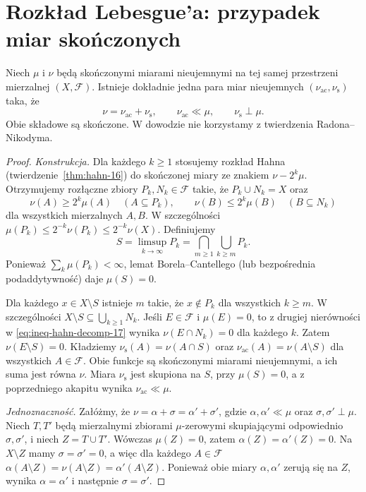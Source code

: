 \section{Rozkład Lebesgue'a: przypadek miar skończonych}
\begin{twierdzenie}
\label{thm:lebesgue-decomp-finite-17}
Niech $\mu$ i $\nu$ będą skończonymi miarami nieujemnymi
na tej samej przestrzeni mierzalnej $(X,\mathcal F)$.
Istnieje dokładnie jedna para miar nieujemnych
$(\nu_{\mathrm{ac}},\nu_{\mathrm{s}})$ taka, że
\begin{equation}\label{eq:decomp-finite-17}
\nu=\nu_{\mathrm{ac}}+\nu_{\mathrm{s}},\qquad
\nu_{\mathrm{ac}}\ll\mu,\qquad \nu_{\mathrm{s}}\perp\mu.
\end{equation}
Obie składowe są skończone. W dowodzie nie korzystamy
z twierdzenia Radona--Nikodyma.
\end{twierdzenie}
\begin{proof}
\emph{Konstrukcja.} Dla każdego $k\ge1$ stosujemy rozkład
Hahna (twierdzenie~\ref{thm:hahn-16}) do skończonej miary
ze znakiem $\nu-2^k\mu$. Otrzymujemy rozłączne zbiory
$P_k,N_k\in\mathcal F$ takie, że
$P_k\cup N_k=X$ oraz
\begin{equation}\label{eq:ineq-hahn-decomp-17}
\nu(A)\ge2^k\mu(A)\quad(A\subseteq P_k),\qquad
\nu(B)\le2^k\mu(B)\quad(B\subseteq N_k)
\end{equation}
dla wszystkich mierzalnych $A,B$. W szczególności
$\mu(P_k)\le2^{-k}\nu(P_k)\le2^{-k}\nu(X)$.
Definiujemy
\[
S=\limsup_{k\to\infty}P_k
  =\bigcap_{m\ge1}\bigcup_{k\ge m}P_k.
\]
Ponieważ $\sum_k\mu(P_k)<\infty$, lemat
Borela--Cantellego (lub bezpośrednia podaddytywność)
daje $\mu(S)=0$.

Dla każdego $x\in X\setminus S$ istnieje $m$ takie,
że $x\notin P_k$ dla wszystkich $k\ge m$.
W szczególności
$X\setminus S\subseteq\bigcup_{k\ge1}N_k$.
Jeśli $E\in\mathcal F$ i $\mu(E)=0$, to z drugiej
nierówności w \eqref{eq:ineq-hahn-decomp-17} wynika
$\nu(E\cap N_k)=0$ dla każdego $k$.
Zatem $\nu(E\setminus S)=0$.
Kładziemy
$\nu_{\mathrm{s}}(A)=\nu(A\cap S)$ oraz
$\nu_{\mathrm{ac}}(A)=\nu(A\setminus S)$
dla wszystkich $A\in\mathcal F$.
Obie funkcje są skończonymi miarami nieujemnymi,
a ich suma jest równa $\nu$.
Miara $\nu_{\mathrm{s}}$ jest skupiona na $S$,
przy $\mu(S)=0$, a z poprzedniego akapitu
wynika $\nu_{\mathrm{ac}}\ll\mu$.

\emph{Jednoznaczność.} Załóżmy, że
$\nu=\alpha+\sigma=\alpha'+\sigma'$,
gdzie $\alpha,\alpha'\ll\mu$ oraz
$\sigma,\sigma'\perp\mu$. Niech $T,T'$ będą
mierzalnymi zbiorami $\mu$-zerowymi skupiającymi
odpowiednio $\sigma,\sigma'$, i niech $Z=T\cup T'$.
Wówczas $\mu(Z)=0$, zatem $\alpha(Z)=\alpha'(Z)=0$.
Na $X\setminus Z$ mamy $\sigma=\sigma'=0$,
a więc dla każdego $A\in\mathcal F$
$\alpha(A\setminus Z)=\nu(A\setminus Z)=\alpha'(A\setminus Z)$.
Ponieważ obie miary $\alpha,\alpha'$ zerują się na $Z$,
wynika $\alpha=\alpha'$ i następnie $\sigma=\sigma'$.
\end{proof}

